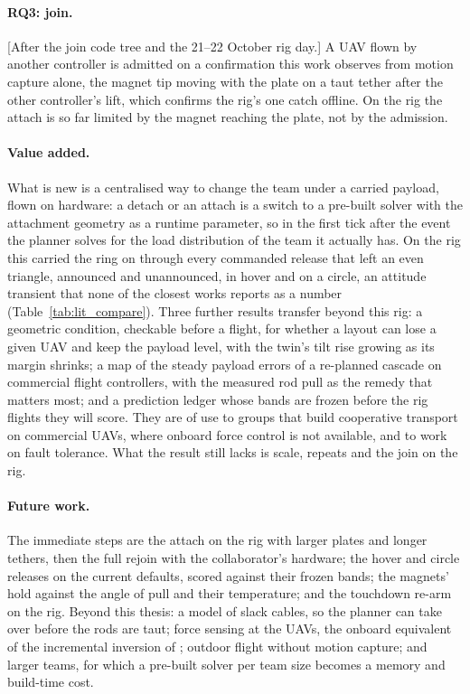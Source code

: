 \paragraph{RQ3: join.} [After the join code tree and the 21--22 October rig day.] A UAV flown by another controller is
admitted on a confirmation this work observes from motion capture alone, the magnet tip moving with the plate on a
taut tether after the other controller's lift, which confirms the rig's one catch offline. On the rig the attach is
so far limited by the magnet reaching the plate, not by the admission.

\paragraph{Value added.} What is new is a centralised way to change the team under a carried payload, flown on
hardware: a detach or an attach is a switch to a pre-built solver with the attachment geometry as a runtime parameter,
so in the first tick after the event the planner solves for the load distribution of the team it actually has. On the
rig this carried the ring on through every commanded release that left an even triangle, announced and unannounced,
in hover and on a circle, an attitude transient that none of the closest works reports as a number
(Table~\ref{tab:lit_compare}). Three further results transfer beyond this rig: a geometric condition, checkable before a
flight, for whether a layout can lose a given UAV and keep the payload level, with the twin's tilt rise growing as its
margin shrinks; a map of the steady payload errors of a re-planned cascade on commercial flight controllers, with the
measured rod pull as the remedy that matters most; and a prediction ledger whose bands are frozen before the rig flights they
will score. They are of use to groups that build cooperative transport on commercial UAVs, where onboard force
control is not available, and to work on fault tolerance. What the result still lacks is scale, repeats and the join on
the rig.

\paragraph{Future work.} The immediate steps are the attach on the rig with larger plates and longer tethers, then the
full rejoin with the collaborator's hardware; the hover and circle releases on the current defaults, scored against
their frozen bands; the magnets' hold against the angle of pull and their temperature; and the touchdown re-arm on the
rig. Beyond this thesis: a model of slack cables, so the planner can take over before the rods are taut; force sensing
at the UAVs, the onboard equivalent of the incremental inversion of \cite{tudelft}; outdoor flight without motion
capture; and larger teams, for which a pre-built solver per team size becomes a memory and build-time cost.
